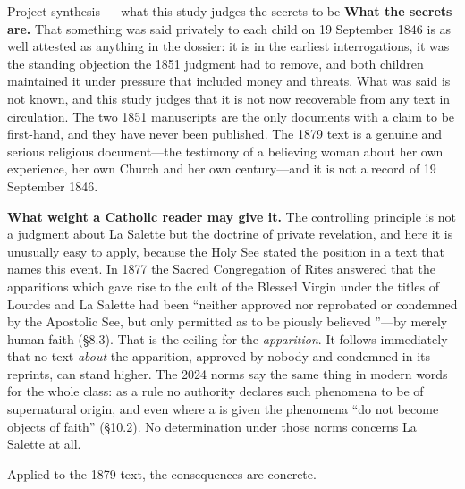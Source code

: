 \begin{judgmentbox}{Project synthesis --- what this study judges the
secrets to be}
\textbf{What the secrets are.} That something was said privately to
each child on 19 September 1846 is as well attested as anything in
the dossier: it is in the earliest interrogations, it was the
standing objection the 1851 judgment had to remove, and both
children maintained it under pressure that included money and
threats. What was said is not known, and this study judges that it
is not now recoverable from any text in circulation. The two 1851
manuscripts are the only documents with a claim to be first-hand,
and they have never been published. The 1879 text is a genuine and
serious religious document---the testimony of a believing woman
about her own experience, her own Church and her own century---and
it is not a record of 19 September 1846.
\end{judgmentbox}

\textbf{What weight a Catholic reader may give it.} The controlling
principle is not a judgment about La Salette but the doctrine of
private revelation, and here it is unusually easy to apply, because
the Holy See stated the position in a text that names this event.
In 1877 the Sacred Congregation of Rites answered that the
apparitions which gave rise to the cult of the Blessed Virgin under
the titles of Lourdes and La Salette had been ``neither approved nor
reprobated or condemned by the Apostolic See, but only permitted as
to be piously believed ''---by merely human
faith (\S8.3). That is the ceiling for the \emph{apparition}. It
follows immediately that no text \emph{about} the apparition,
approved by nobody and condemned in its reprints, can stand higher.
The 2024 norms say the same thing in modern words for the whole
class: as a rule no authority declares such phenomena to be of
supernatural origin, and even where a  is given
the phenomena ``do not become objects of faith'' (\S10.2). No
determination under those norms concerns La Salette at all.

Applied to the 1879 text, the consequences are concrete.

